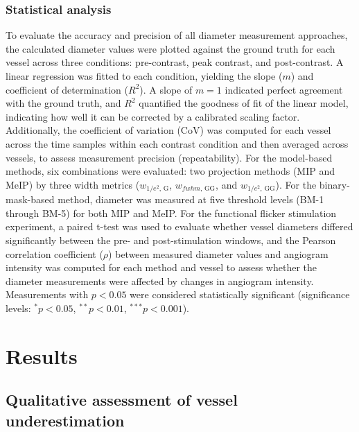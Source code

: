 \documentclass{optica-article}
\begin{document}
\subsubsection{Statistical analysis}
\label{subsubsec:stats}
To evaluate the accuracy and precision of all diameter measurement approaches, the calculated diameter values were plotted against the ground truth for each vessel across three conditions: pre-contrast, peak contrast, and post-contrast. A linear regression was fitted to each condition, yielding the slope ($m$) and coefficient of determination ($R^2$). A slope of $m = 1$ indicated perfect agreement with the ground truth, and $R^2$ quantified the goodness of fit of the linear model, indicating how well it can be corrected by a calibrated scaling factor. Additionally, the coefficient of variation (CoV) was computed for each vessel across the time samples within each contrast condition and then averaged across vessels, to assess measurement precision (repeatability). For the model-based methods, six combinations were evaluated: two projection methods (MIP and MeIP) by three width metrics ($w_{1/e^2,\,\mathrm{G}}$, $w_{fwhm,\,\mathrm{GG}}$, and $w_{1/e^2,\,\mathrm{GG}}$). For the binary-mask-based method, diameter was measured at five threshold levels (BM-1 through BM-5) for both MIP and MeIP. For the functional flicker stimulation experiment, a paired t-test was used to evaluate whether vessel diameters differed significantly between the pre- and post-stimulation windows, and the Pearson correlation coefficient ($\rho$) between measured diameter values and angiogram intensity was computed for each method and vessel to assess whether the diameter measurements were affected by changes in angiogram intensity. Measurements with $p < 0.05$ were considered statistically significant (significance levels: $^{*}p < 0.05$, $^{**}p < 0.01$, $^{***}p < 0.001$). 

\section{Results}
\subsection{Qualitative assessment of vessel underestimation}
\label{subsec:qualitative}
\end{document}
